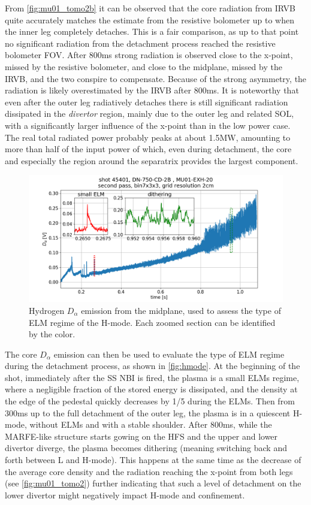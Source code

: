 From \autoref{fig:mu01_tomo2b} it can be observed that the core radiation from IRVB quite accurately matches the estimate from the resistive bolometer up to when the inner leg completely detaches. This is a fair comparison, as up to that point no significant radiation from the detachment process reached the resistive bolometer FOV. After 800ms strong radiation is observed close to the x-point, missed by the resistive bolometer, and close to the midplane, missed by the IRVB, and the two conspire to compensate. Because of the strong asymmetry, the radiation is likely overestimated by the IRVB after 800ms. It is noteworthy that even after the outer leg radiatively detaches there is still significant radiation dissipated in the \emph{divertor} region, mainly due to the outer leg and related SOL, with a significantly larger influence of the x-point than in the low power case. The real total radiated power probably peaks at about 1.5MW, amounting to more than half of the input power of which, even during detachment, the core and especially the region around the separatrix provides the largest component.

\begin{figure}[!ht]
	\centering
	\includegraphics[trim={40 0 80 50},clip,width=0.8\linewidth]{Chapters/chapter2/figs/IRVB-MASTU_shot-45401_pass1_bin7x3x3_gridres2cm_all_variables_absolute_small4.png}
	\caption{Hydrogen $D_{\alpha}$ emission from the midplane, used to assess the type of ELM regime of the H-mode. Each zoomed section can be identified by the color.}
	\label{fig:hmode}
\end{figure}

The core $D_{\alpha}$ emission can then be used to evaluate the type of ELM regime during the detachment process, as shown in \autoref{fig:hmode}. At the beginning of the shot, immediately after the SS NBI is fired, the plasma is a small ELMs regime, where a negligible fraction of the stored energy is dissipated, and the density at the edge of the pedestal quickly decreases by 1/5 during the ELMs. Then from 300ms up to the full detachment of the outer leg, the plasma is in a quiescent H-mode, without ELMs and with a stable shoulder. After 800ms, while the MARFE-like structure starts gowing on the HFS and the upper and lower divertor diverge, the plasma becomes dithering (meaning switching back and forth between L and H-mode). This happens at the same time as the decrease of the average core density and the radiation reaching the x-point from both legs (see \autoref{fig:mu01_tomo2}) further indicating that such a level of detachment on the lower divertor might negatively impact H-mode and confinement.

